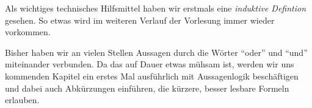 Als wichtiges technisches Hilfsmittel haben wir erstmals eine
\emph{induktive Defintion} gesehen.
%
So etwas wird im weiteren Verlauf der Vorlesung immer wieder
vorkommen.

Bisher haben wir an vielen Stellen Aussagen durch die Wörter "`oder"'
und "`und"' miteinander verbunden.
%
Da das auf Dauer etwas mühsam ist, werden wir uns kommenden Kapitel
ein erstes Mal ausführlich mit Aussagenlogik beschäftigen und dabei
auch Abkürzungen einführen, die kürzere, besser lesbare Formeln
erlauben.

\cleardoublepage


